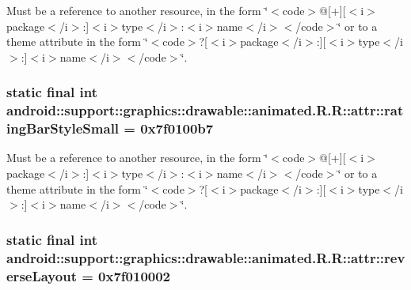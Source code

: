 Must be a reference to another resource, in the form \char`\"{}$<$code$>$@\mbox{[}+\mbox{]}\mbox{[}$<$i$>$package$<$/i$>$:\mbox{]}$<$i$>$type$<$/i$>$:$<$i$>$name$<$/i$>$$<$/code$>$\char`\"{} or to a theme attribute in the form \char`\"{}$<$code$>$?\mbox{[}$<$i$>$package$<$/i$>$:\mbox{]}\mbox{[}$<$i$>$type$<$/i$>$:\mbox{]}$<$i$>$name$<$/i$>$$<$/code$>$\char`\"{}. \hypertarget{classandroid_1_1support_1_1graphics_1_1drawable_1_1animated_1_1_r_1_1attr_fc8db74f0ba732e0d108a22503ddf0f0}{
\subsubsection[{ratingBarStyleSmall}]{\setlength{\rightskip}{0pt plus 5cm}static final int android::support::graphics::drawable::animated.R.R::attr::ratingBarStyleSmall = 0x7f0100b7}}
\label{classandroid_1_1support_1_1graphics_1_1drawable_1_1animated_1_1_r_1_1attr_fc8db74f0ba732e0d108a22503ddf0f0}


Must be a reference to another resource, in the form \char`\"{}$<$code$>$@\mbox{[}+\mbox{]}\mbox{[}$<$i$>$package$<$/i$>$:\mbox{]}$<$i$>$type$<$/i$>$:$<$i$>$name$<$/i$>$$<$/code$>$\char`\"{} or to a theme attribute in the form \char`\"{}$<$code$>$?\mbox{[}$<$i$>$package$<$/i$>$:\mbox{]}\mbox{[}$<$i$>$type$<$/i$>$:\mbox{]}$<$i$>$name$<$/i$>$$<$/code$>$\char`\"{}. \hypertarget{classandroid_1_1support_1_1graphics_1_1drawable_1_1animated_1_1_r_1_1attr_a36824a6b6352b37f1314f49929bd44b}{
\subsubsection[{reverseLayout}]{\setlength{\rightskip}{0pt plus 5cm}static final int android::support::graphics::drawable::animated.R.R::attr::reverseLayout = 0x7f010002}}
\label{classandroid_1_1support_1_1graphics_1_1drawable_1_1animated_1_1_r_1_1attr_a36824a6b6352b37f1314f49929bd44b}


